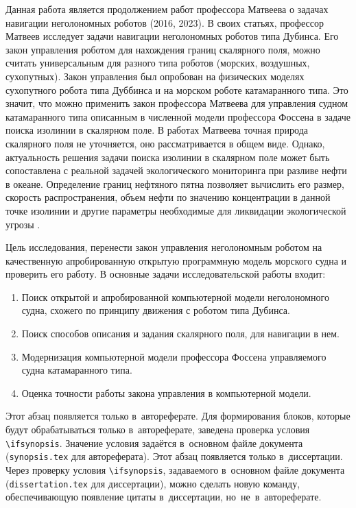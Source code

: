 Данная работа является продолжением работ профессора Матвеева о задачах навигации неголономных роботов (2016, 2023)\cite{matveev2016}\cite{matveev2023}.
В своих статьях, профессор Матвеев исследует задачи навигации неголономных роботов типа Дубинса.
Его закон управления роботом для нахождения границ скалярного поля, можно считать универсальным для разного типа роботов (морских, воздушных, сухопутных).
Закон управления был опробован на физических моделях сухопутного робота типа Дуббинса\cite{semakova2017phdthesis} и на морском роботе катамаранного типа\cite{matveev2023}.
Это значит, что можно применить закон профессора Матвеева для управления судном катамаранного типа описанным в численной модели профессора Фоссена в задаче поиска изолинии в скалярном поле.
В работах Матвеева точная природа скалярного поля не уточняется, оно рассматривается в общем виде.
Однако, актуальность решения задачи поиска изолинии в скалярном поле может быть сопоставлена с реальной задачей экологического мониторинга при разливе нефти в океане.
Определение границ нефтяного пятна позволяет вычислить его размер, скорость распространения, объем нефти по значению концентрации в данной точке изолинии и другие параметры необходимые для ликвидации экологической угрозы \cite{Aznar2014}.

Цель исследования, перенести закон управления неголономным роботом на качественную апробированную открытую программную модель морского судна и проверить его работу.
В основные задачи исследовательской работы входит:
\begin{enumerate}
    \item Поиск открытой и апробированной компьютерной модели неголономного судна, схожего по принципу движения с роботом типа Дубинса.
    \item  Поиск способов описания и задания скалярного поля, для навигации в нем.
    \item Модернизация компьютерной модели профессора Фоссена управляемого судна катамаранного типа.
    \item Оценка точности работы закона управления в компьютерной модели.
\end{enumerate}

\ifsynopsis
Этот абзац появляется только в~автореферате.
Для формирования блоков, которые будут обрабатываться только в~автореферате,
заведена проверка условия \verb!\!\verb!ifsynopsis!.
Значение условия задаётся в~основном файле документа (\verb!synopsis.tex! для
автореферата).
\else
Этот абзац появляется только в~диссертации.
Через проверку условия \verb!\!\verb!ifsynopsis!, задаваемого в~основном файле
документа (\verb!dissertation.tex! для диссертации), можно сделать новую
команду, обеспечивающую появление цитаты в~диссертации, но~не~в~автореферате.
\fi

